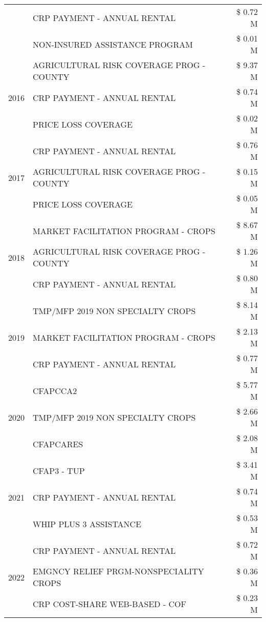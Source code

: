 \begin{tabular}{llr}
 & CRP PAYMENT - ANNUAL RENTAL & \$ 0.72 M \\
 & NON-INSURED ASSISTANCE PROGRAM & \$ 0.01 M \\
\cline{1-3}
\multirow[t]{3}{*}{2016} & AGRICULTURAL RISK COVERAGE PROG - COUNTY & \$ 9.37 M \\
 & CRP PAYMENT - ANNUAL RENTAL & \$ 0.74 M \\
 & PRICE LOSS COVERAGE & \$ 0.02 M \\
\cline{1-3}
\multirow[t]{3}{*}{2017} & CRP PAYMENT - ANNUAL RENTAL & \$ 0.76 M \\
 & AGRICULTURAL RISK COVERAGE PROG - COUNTY & \$ 0.15 M \\
 & PRICE LOSS COVERAGE & \$ 0.05 M \\
\cline{1-3}
\multirow[t]{3}{*}{2018} & MARKET FACILITATION PROGRAM - CROPS & \$ 8.67 M \\
 & AGRICULTURAL RISK COVERAGE PROG - COUNTY & \$ 1.26 M \\
 & CRP PAYMENT - ANNUAL RENTAL & \$ 0.80 M \\
\cline{1-3}
\multirow[t]{3}{*}{2019} & TMP/MFP 2019 NON SPECIALTY CROPS & \$ 8.14 M \\
 & MARKET FACILITATION PROGRAM - CROPS & \$ 2.13 M \\
 & CRP PAYMENT - ANNUAL RENTAL & \$ 0.77 M \\
\cline{1-3}
\multirow[t]{3}{*}{2020} & CFAPCCA2 & \$ 5.77 M \\
 & TMP/MFP 2019 NON SPECIALTY CROPS & \$ 2.66 M \\
 & CFAPCARES & \$ 2.08 M \\
\cline{1-3}
\multirow[t]{3}{*}{2021} & CFAP3 - TUP & \$ 3.41 M \\
 & CRP PAYMENT - ANNUAL RENTAL & \$ 0.74 M \\
 & WHIP PLUS 3 ASSISTANCE & \$ 0.53 M \\
\cline{1-3}
\multirow[t]{3}{*}{2022} & CRP PAYMENT - ANNUAL RENTAL & \$ 0.72 M \\
 & EMGNCY RELIEF PRGM-NONSPECIALITY CROPS & \$ 0.36 M \\
 & CRP COST-SHARE WEB-BASED - COF & \$ 0.23 M \\
\cline{1-3}
\bottomrule
\end{tabular}

